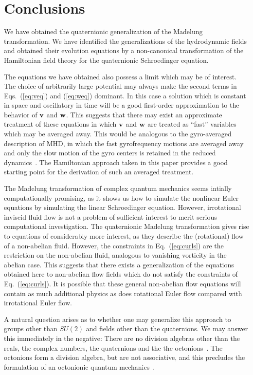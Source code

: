 \documentclass[a4paper,aps,prd,preprint,groupedaddress]{revtex4}
\newcommand{\bfv}{{\bf v}}
\newcommand{\bfw}{{\bf w}}
\begin{document}
\section{Conclusions}

We have obtained the quaternionic generalization of the Madelung transformation. We have identified the generalizations of the hydrodynamic  fields and obtained their evolution equations by a non-canonical transformation of the Hamiltonian field theory for the quaternionic Schroedinger equation. 

The equations we have obtained also possess a limit which may be of interest. The choice of arbitrarily large potential may always make the second terms in Eqs.~(\ref{eq:veq}) and (\ref{eq:weq}) dominant. In this case a solution which is constant in space and oscillatory in time will be a good first-order approximation to the behavior of $\bfv$ and $\bfw$. This suggests that there may exist an approximate treatment of these equations in which $\bfv$ and $\bfw$ are treated as ``fast'' variables which may be averaged away. This would be analogous to the gyro-averaged description of MHD, in which the fast gyrofrequency motions are averaged away and only the slow motion of the gyro centers is retained in the reduced dynamics~\cite{bib:gyroav1,bib:gyroav2,bib:gyroav3}. The Hamiltonian approach taken in this paper provides a good starting point for the derivation of such an averaged treatment.

The Madelung transformation of complex quantum mechanics seems intially computationally promising, as it shows us how to simulate the nonlinear Euler equations by simulating the linear Schroedinger equation. However, irrotational inviscid fluid flow is not a problem of sufficient interest to merit serious computational investigation. The quaternionic Madelung transformation gives rise to equations of considerably more interest, as they describe the (rotational) flow of a non-abelian fluid.  However, the constraints in Eq.~(\ref{eq:curls}) are the restriction on the non-abelian fluid, analogous to vanishing vorticity in the abelian case. This suggests that there exists a generalization of the equations obtained here to non-abelian flow fields which do not satisfy the constraints of Eq.~(\ref{eq:curls}). It is possible that these general non-abelian flow equations will contain as much additional physics as does rotational Euler flow compared with irrotational Euler flow. 

A natural question arises as to whether one may generalize this approach to groups other than $SU(2)$ and fields other than the quaternions. We may answer this immediately in the negative: There are no division algebras other than the reals, the complex numbers, the quaternions and the the octonions~\cite{bib:quatbook}. The octonions form a division algebra, but are not associative, and this precludes the formulation of an octonionic quantum mechanics~\cite{bib:adlerbook}.
\end{document}
